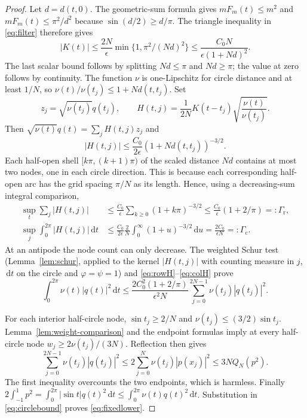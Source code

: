 \documentclass{siamart251216}
\newcommand{\dd}{\,\mathrm d}
\begin{document}
\begin{proof}
Let $d=d(t,0)$. The geometric-sum formula gives
$mF_m(t)\le m^2$ and $mF_m(t)\le\pi^2/d^2$ because
$\sin(d/2)\ge d/\pi$. The triangle inequality in \eqref{eq:filter}
therefore gives
\begin{equation}\label{eq:filter-decay}
 |K(t)|\le\frac{2N}{\epsilon}\min\{1,\pi^2/(Nd)^2\}
       \le\frac{C_0N}{\epsilon(1+Nd)^2}.
\end{equation}
The last scalar bound follows by splitting $Nd\le\pi$ and $Nd\ge\pi$;
the value at zero follows by continuity.
The function $\nu$ is one-Lipschitz for circle distance and at least $1/N$,
so $\nu(t)/\nu(t_j)\le1+Nd(t,t_j)$. Set
\[
 z_j=\sqrt{\nu(t_j)}q(t_j),\qquad
 H(t,j)=\frac1{2N}K(t-t_j)\sqrt{\frac{\nu(t)}{\nu(t_j)}}.
\]
Then $\sqrt{\nu(t)}q(t)=\sum_jH(t,j)z_j$ and
\begin{equation}\label{eq:Hdecay}
 |H(t,j)|\le\frac{C_0}{2\epsilon}(1+Nd(t,t_j))^{-3/2}.
\end{equation}
Each half-open shell $[k\pi,(k+1)\pi)$ of the scaled distance $Nd$
contains at most two nodes, one in each circle direction. This is because
each corresponding half-open arc has the grid spacing $\pi/N$ as its length.
Hence, using a decreasing-sum integral comparison,
\begin{align}
 \sup_t\sum_j|H(t,j)|
 &\le\frac{C_0}{\epsilon}\sum_{k\ge0}(1+k\pi)^{-3/2}
 \le\frac{C_0}{\epsilon}(1+2/\pi)=:\Gamma_{\mathrm r},\label{eq:rowH}\\
 \sup_j\int_0^{2\pi}|H(t,j)|\dd t
 &\le\frac{C_0}{2\epsilon}\frac2N
                 \int_0^\infty(1+u)^{-3/2}\dd u
 =\frac{2C_0}{\epsilon N}=:\Gamma_{\mathrm c}.\label{eq:colH}
\end{align}
At an antipode the node count can only decrease. The weighted Schur test
(Lemma~\ref{lem:schur}, applied to the kernel $|H(t,j)|$ with counting
measure in $j$, $\dd t$ on the circle and $\varphi=\psi=1$) and
\eqref{eq:rowH}--\eqref{eq:colH} prove
\begin{equation}\label{eq:circlebound}
 \int_0^{2\pi}\nu(t)|q(t)|^2\dd t
 \le\frac{2C_0^2(1+2/\pi)}{\epsilon^2N}
          \sum_{j=0}^{2N-1}\nu(t_j)|q(t_j)|^2.
\end{equation}

For each interior half-circle node, $\sin t_j\ge2/N$ and
$\nu(t_j)\le(3/2)\sin t_j$. Lemma~\ref{lem:weight-comparison} and
the endpoint formulas imply at every half-circle node
$w_j\ge2\nu(t_j)/(3N)$. Reflection then gives
\[
 \sum_{j=0}^{2N-1}\nu(t_j)|q(t_j)|^2
 \le2\sum_{j=0}^N\nu(t_j)|p(x_j)|^2\le3NQ_N(p^2).
\]
The first inequality overcounts the two endpoints, which is harmless.
Finally $2\int_{-1}^1p^2=\int_0^{2\pi}|\sin t|q(t)^2\dd t
\le\int_0^{2\pi}\nu(t)q(t)^2\dd t$.
Substitution in \eqref{eq:circlebound} proves \eqref{eq:fixedlower}.
\end{proof}
\end{document}
